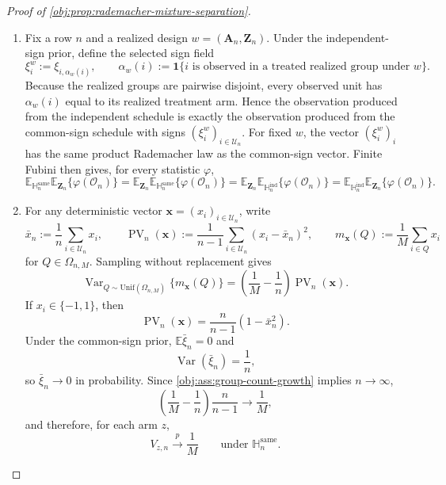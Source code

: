 \begin{proof}[Proof of \cref{obj:prop:rademacher-mixture-separation}]
\begin{enumerate}
\item Fix a row \(n\) and a realized design \(w=(\mathbf A_n,\mathbf Z_n)\).  Under the independent-sign prior, define the selected sign field
\[
\xi_i^{w}:=\xi_{i,\alpha_w(i)},
\qquad
\alpha_w(i):=\mathbf 1\{i\text{ is observed in a treated realized group under }w\}.
\]
Because the realized groups are pairwise disjoint, every observed unit has \(\alpha_w(i)\) equal to its realized treatment arm.  Hence the observation produced from the independent schedule is exactly the observation produced from the common-sign schedule with signs \((\xi_i^w)_{i\in\mathcal U_n}\).  For fixed \(w\), the vector \((\xi_i^w)_i\) has the same product Rademacher law as the common-sign vector.  Finite Fubini then gives, for every statistic \(\varphi\),
\[
\mathbb E_{\mathbb H_n^{\mathrm{same}}}\mathbb E_{\mathbf Z_n}\{\varphi(\mathcal O_n)\}
=
\mathbb E_{\mathbf Z_n}\mathbb E_{\mathbb H_n^{\mathrm{same}}}\{\varphi(\mathcal O_n)\}
=
\mathbb E_{\mathbf Z_n}\mathbb E_{\mathbb H_n^{\mathrm{ind}}}\{\varphi(\mathcal O_n)\}
=
\mathbb E_{\mathbb H_n^{\mathrm{ind}}}\mathbb E_{\mathbf Z_n}\{\varphi(\mathcal O_n)\}.
\]

\item For any deterministic vector \(\boldsymbol x=(x_i)_{i\in\mathcal U_n}\), write
\[
\bar x_n:=\frac1n\sum_{i\in\mathcal U_n}x_i,
\qquad
\operatorname{PV}_n(\boldsymbol x):=\frac1{n-1}\sum_{i\in\mathcal U_n}(x_i-\bar x_n)^2,
\qquad
m_{\boldsymbol x}(Q):=\frac1M\sum_{i\in Q}x_i
\]
for \(Q\in\Omega_{n,M}\).  Sampling without replacement gives
\[
\operatorname{Var}_{Q\sim\mathrm{Unif}(\Omega_{n,M})}\{m_{\boldsymbol x}(Q)\}
=
\left(\frac1M-\frac1n\right)\operatorname{PV}_n(\boldsymbol x).
\]
If \(x_i\in\{-1,1\}\), then
\[
\operatorname{PV}_n(\boldsymbol x)
=
\frac n{n-1}\left(1-\bar x_n^2\right).
\]
Under the common-sign prior, \(\mathbb E\bar\xi_n=0\) and
\[
\operatorname{Var}(\bar\xi_n)=\frac1n,
\]
so \(\bar\xi_n\to 0\) in probability.  Since \cref{obj:ass:group-count-growth} implies \(n\to\infty\),
\[
\left(\frac1M-\frac1n\right)\frac n{n-1}\to\frac1M,
\]
and therefore, for each arm \(z\),
\[
V_{z,n}\stackrel{p}{\longrightarrow}\frac1M
\qquad
\text{under }\mathbb H_n^{\mathrm{same}}.
\]


\end{enumerate}
\end{proof}
